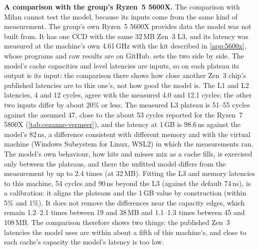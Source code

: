 \textbf{A comparison with the group's Ryzen~5 5600X.} The comparison with Milan cannot test the model, because its inputs come from the same kind of measurement. The group's own Ryzen~5 5600X provides data the model was not built from. It has one CCD with the same 32\,MB Zen~3 L3, and its latency was measured at the machine's own 4.61\,GHz with the kit described in \cref{app:5600x}, whose programs and raw results are on GitHub.  sets the two side by side. The model's cache capacities and level latencies are inputs, so on each plateau its output is its input: the comparison there shows how close another Zen~3 chip's published latencies are to this one's, not how good the model is. The L1 and L2 latencies, 4 and 12 cycles, agree with the measured 4.0 and 12.1 cycles; the other two inputs differ by about 20\% or less. The measured L3 plateau is 51--55 cycles against the assumed 47, close to the about 53 cycles reported for the Ryzen~7 5800X (\cref{tab:cezanne-vermeer}), and the latency at 1\,GB is 98.6\,ns against the model's 82\,ns, a difference consistent with different memory and with the virtual machine (Windows Subsystem for Linux, WSL2) in which the measurements ran. The model's own behaviour, how hits and misses mix as a cache fills, is exercised only between the plateaus, and there the unfitted model differs from the measurement by up to 2.4 times (at 32\,MB). Fitting the L3 and memory latencies to this machine, 54 cycles and 90\,ns beyond the L3 (against the default 74\,ns), is a calibration: it aligns the plateaus and the 1\,GB value by construction (within 5\% and 1\%). It does not remove the differences near the capacity edges, which remain 1.2--2.1 times between 19 and 38\,MB and 1.1--1.3 times between 45 and 108\,MB. The comparison therefore shows two things: the published Zen~3 latencies the model uses are within about a fifth of this machine's, and close to each cache's capacity the model's latency is too low.


